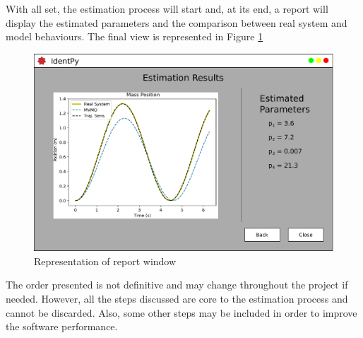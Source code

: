 With all set, the estimation process will start and, at its end, a report will display the estimated parameters and the comparison between real system and model behaviours. The final view is represented in Figure \ref{fig: final_pg}

\begin{figure}[h]
	\caption{Representation of report window}
	\begin{center}
		\includegraphics[scale=.5]{Images/Software_final_pg.eps}
	\end{center}
	\label{fig: final_pg}
\end{figure}

The order presented is not definitive and may change throughout the project if needed. However, all the steps discussed are core to the estimation process and cannot be discarded. Also, some other steps may be included in order to improve the software performance.